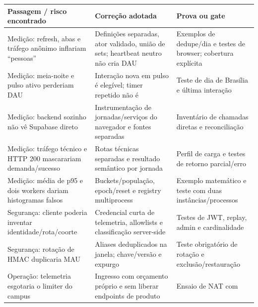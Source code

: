 \documentclass[10pt,a4paper]{article}
\begin{document}
{\def\LTcaptype{none} %
\small
{}
\begin{longtable}[]{@{}
  >{\raggedright\arraybackslash}p{}
  >{\raggedright\arraybackslash}p{}
  >{\raggedright\arraybackslash}p{}@{}}
\toprule\noalign{}
\rowcolor{NFAccent}
\begin{minipage}[b]{\linewidth}\raggedright
Passagem / risco encontrado
\end{minipage} & \begin{minipage}[b]{\linewidth}\raggedright
Correção adotada
\end{minipage} & \begin{minipage}[b]{\linewidth}\raggedright
Prova ou gate
\end{minipage} \\
\midrule\noalign{}
\endhead
\bottomrule\noalign{}
\endlastfoot
Medição: refresh, abas e tráfego anônimo inflariam ``pessoas'' &
Definições separadas, ator validado, união de sets; heartbeat neutro não
cria DAU & Exemplos de dedupe/dia e testes de browser; cobertura
explícita \\
Medição: meia-noite e pulso ativo perderiam DAU & Interação nova em
pulso é elegível; timer repetido não é & Teste de dia de Brasília e
última interação \\
Medição: backend sozinho não vê Supabase direto & Instrumentação de
jornadas/serviços do navegador e fontes separadas & Inventário de
chamadas diretas e reconciliação \\
Medição: tráfego técnico e HTTP 200 mascarariam demanda/sucesso & Rotas
técnicas separadas e resultado semântico por jornada & Perfil de carga e
testes de retorno parcial/erro \\
Medição: média de p95 e dois workers dariam histogramas falsos &
Buckets/população, epoch/reset e registry multiprocess & Exemplo
matemático e teste com duas instâncias/processos \\
Segurança: cliente poderia inventar identidade/rota/coorte & Credencial
curta de telemetria, allowlists e classificação server-side & Testes de
JWT, replay, admin e cardinalidade \\
Segurança: rotação de HMAC duplicaria MAU & Aliases deduplicados na
janela; chave/versão e expurgo & Teste obrigatório de rotação e
exclusão/restauração \\
Operação: telemetria esgotaria o limiter do campus & Ingresso com
orçamento próprio e sem liberar endpoints de produto & Ensaio de NAT com

\end{longtable}}
\end{document}
